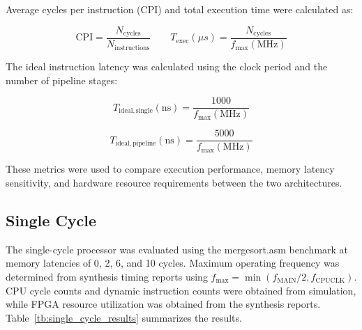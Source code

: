 \documentclass[12pt]{article}
\begin{document}
Average cycles per instruction (CPI) and total execution time were calculated as:

\[
\mathrm{CPI}=\frac{N_{\mathrm{cycles}}}{N_{\mathrm{instructions}}}
\qquad
T_{\mathrm{exec}}(\mu s)=\frac{N_{\mathrm{cycles}}}{f_{\max}(\mathrm{MHz})}
\]

The ideal instruction latency was calculated using the clock period and the number of pipeline stages:

\[
T_{\mathrm{ideal,single}}(\mathrm{ns})
=\frac{1000}{f_{\max}(\mathrm{MHz})}
\]

\[
T_{\mathrm{ideal,pipeline}}(\mathrm{ns})
=\frac{5000}{f_{\max}(\mathrm{MHz})}
\]

These metrics were used to compare execution performance, memory latency sensitivity, and hardware resource requirements between the two architectures.

\subsection{Single Cycle}

The single-cycle processor was evaluated using the mergesort.asm benchmark at memory latencies of 0, 2, 6, and 10 cycles. Maximum operating frequency was determined from synthesis timing reports using $f_{\max}=\min(f_{\mathrm{MAIN}}/2,f_{\mathrm{CPUCLK}})$. CPU cycle counts and dynamic instruction counts were obtained from simulation, while FPGA resource utilization was obtained from the synthesis reports. Table~\ref{tb:single_cycle_results} summarizes the results.
\end{document}
